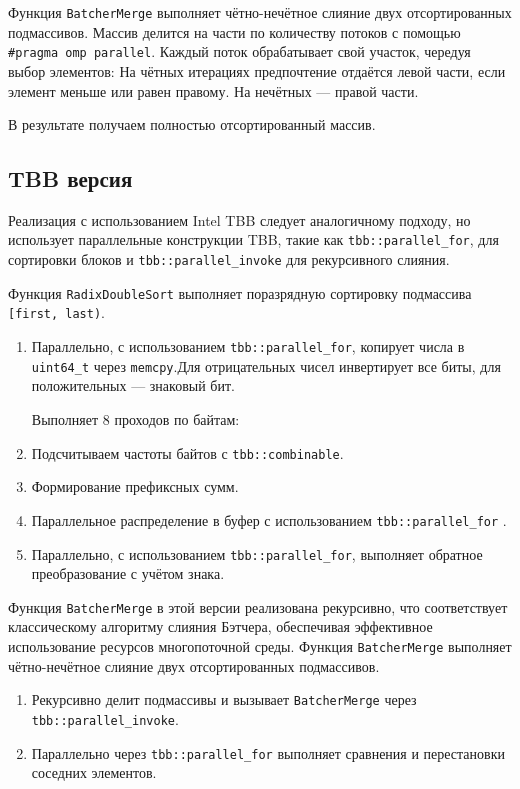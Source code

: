 \documentclass[12pt,a4paper]{extarticle}
\begin{document}
	Функция \texttt{BatcherMerge} выполняет чётно-нечётное слияние двух отсортированных подмассивов. Массив делится на части по количеству потоков с помощью \texttt{\#pragma omp parallel}. Каждый поток обрабатывает свой участок, чередуя выбор элементов:  На чётных итерациях предпочтение отдаётся левой части, если элемент меньше или равен правому. На нечётных — правой части.
	
	В результате получаем полностью отсортированный массив.


	\subsection{TBB версия}
	Реализация с использованием Intel TBB следует аналогичному подходу, но использует параллельные конструкции TBB, такие как \texttt{tbb::parallel\_for}, для сортировки блоков и \texttt{tbb::parallel\_invoke} для рекурсивного слияния. 
		
	
	Функция \texttt{RadixDoubleSort} выполняет поразрядную сортировку подмассива \texttt{[first, last)}.
	
	\begin{enumerate}
	\item Параллельно, с использованием \texttt{tbb::parallel\_for}, копирует числа в \texttt{uint64\_t} через \texttt{memcpy}.Для отрицательных чисел инвертирует все биты, для положительных --- знаковый бит.

	Выполняет 8 проходов по байтам:
	\item Подсчитываем частоты байтов с \texttt{tbb::combinable}.
	\item Формирование префиксных сумм.
	\item Параллельное распределение в буфер с использованием \texttt{tbb::parallel\_for} .
	\item Параллельно, с использованием \texttt{tbb::parallel\_for}, выполняет обратное преобразование с учётом знака.		
	\end{enumerate}
	
	Функция \texttt{BatcherMerge} в этой версии реализована рекурсивно, что соответствует классическому алгоритму слияния Бэтчера, обеспечивая эффективное использование ресурсов многопоточной среды. Функция \texttt{BatcherMerge} выполняет чётно-нечётное слияние двух отсортированных подмассивов.
	
	\begin{enumerate}
		\item Рекурсивно делит подмассивы и вызывает \texttt{BatcherMerge} через \texttt{tbb::parallel\_invoke}.
		\item Параллельно через \texttt{tbb::parallel\_for} выполняет сравнения и перестановки соседних элементов.
	\end{enumerate}
\end{document}
